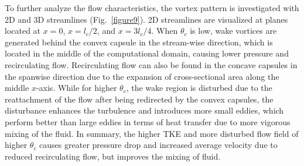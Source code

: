 \documentclass[review,12pt]{elsarticle}
\begin{document}
To further analyze the flow characteristics, the vortex pattern is investigated with 2D and 3D streamlines (Fig.~\ref{figure9}). 2D streamlines are visualized at planes located at $x = 0$, $x = l_c/2$, and $x = 3l_c/4$. When $\theta_c$ is low, wake vortices are generated behind the convex capsule in the stream-wise direction, which is located in the middle of the computational domain, causing lower pressure and recirculating flow. Recirculating flow can also be found in the concave capsules in the spanwise direction due to the expansion of cross-sectional area along the middle $x$-axis. While for higher $\theta_c$, the wake region is disturbed due to the reattachment of the flow after being redirected by the convex capsules, the disturbance enhances the turbulence and introduces more small eddies, which perform better than large eddies in terms of heat transfer due to more vigorous mixing of the fluid. In summary, the higher TKE and more disturbed flow field of higher $\theta_c$ causes greater pressure drop and increased average velocity due to reduced recirculating flow, but improves the mixing of fluid.
\end{document}
